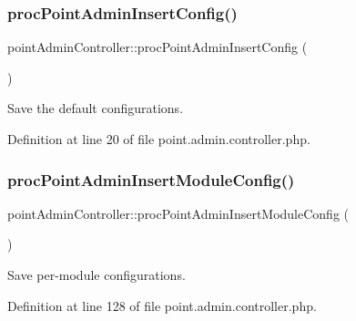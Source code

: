 \hypertarget{classpointAdminController_a57b75694a363d0c8dc6d46ffce1ce25d}{}\label{classpointAdminController_a57b75694a363d0c8dc6d46ffce1ce25d} 
\subsubsection{\texorpdfstring{proc\+Point\+Admin\+Insert\+Config()}{procPointAdminInsertConfig()}}
{\footnotesize\ttfamily point\+Admin\+Controller\+::proc\+Point\+Admin\+Insert\+Config (\begin{DoxyParamCaption}{ }\end{DoxyParamCaption})}



Save the default configurations. 



Definition at line 20 of file point.\+admin.\+controller.\+php.

\hypertarget{classpointAdminController_a8358535932ea77e28e3510b4f42d1083}{}\label{classpointAdminController_a8358535932ea77e28e3510b4f42d1083} 
\subsubsection{\texorpdfstring{proc\+Point\+Admin\+Insert\+Module\+Config()}{procPointAdminInsertModuleConfig()}}
{\footnotesize\ttfamily point\+Admin\+Controller\+::proc\+Point\+Admin\+Insert\+Module\+Config (\begin{DoxyParamCaption}{ }\end{DoxyParamCaption})}



Save per-\/module configurations. 



Definition at line 128 of file point.\+admin.\+controller.\+php.

\hypertarget{classpointAdminController_a54aeea5eae9769da55bd85159a41501a}{}\label{classpointAdminController_a54aeea5eae9769da55bd85159a41501a} 
